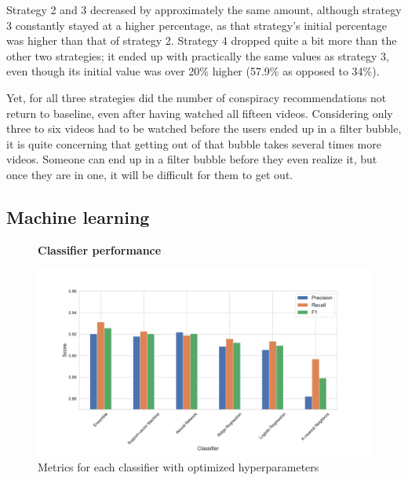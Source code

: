 \documentclass[../main.tex]{subfiles}
\begin{document}
Strategy 2 and 3 decreased by approximately the same amount, although strategy 3 constantly stayed at a
higher percentage, as that strategy's initial percentage was higher than that of strategy 2. Strategy 4 dropped
quite a bit more than the other two strategies; it ended up with practically the same values as strategy 3, even
though its initial value was over 20\% higher (57.9\% as opposed to 34\%). 

Yet, for all three strategies did the number of conspiracy recommendations not return to baseline, even after 
having watched all fifteen videos. Considering only three to six videos had to be watched before the users ended
up in a filter bubble, it is quite concerning that getting out of that bubble takes several times more videos. 
Someone can end up in a filter bubble before they even realize it, but once they are in one, it will be 
difficult for them to get out. 

\subsection{Machine learning} \label{ML_results}

\begin{figure}
  \textbf{Classifier performance}\par\medskip
  \centering
  \includegraphics[keepaspectratio, width=\textwidth]{images/classifier_results.pdf}
  \caption{Metrics for each classifier with optimized hyperparameters}
  \label{fig:ML_scores}
\end{figure}
\end{document}
